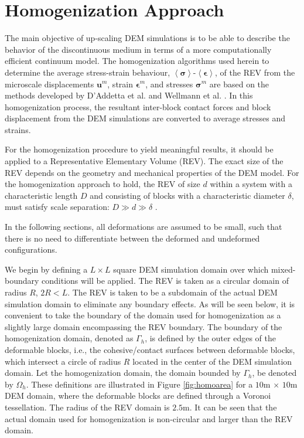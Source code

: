 \section{Homogenization Approach}

The main objective of up-scaling DEM simulations is to be able to describe the  behavior of the discontinuous medium in terms of a more computationally efficient continuum model. The homogenization algorithms used herein to determine the average stress-strain behaviour, $\left<\boldsymbol{\sigma}\right>$-$\left<\boldsymbol{\epsilon}\right>$, of the REV from the microscale displacements $\mathbf{u}^m$, strain $\boldsymbol{\epsilon}^m$, and stresses $\boldsymbol{\sigma}^m$ are based on the methods developed by D'Addetta et al. \citet{daddetta_particle_2004} and Wellmann et al. \citet{wellmann_homogenization_2008}. In this homogenization process, the resultant inter-block contact forces and block displacement from the DEM simulations are converted to average stresses and strains.

For the homogenization procedure to yield meaningful results, it should be applied to a Representative Elementary Volume (REV). The exact size of the REV depends on the geometry and mechanical properties of the DEM model. For the homogenization approach to hold, the REV of size $d$ within a system with a characteristic length $D$ and consisting of blocks with a characteristic diameter $\delta$, must satisfy scale separation: $D\gg d\gg\delta$ \citep{wellmann_homogenization_2008}. 

In the following sections, all deformations are assumed to be small, such that there is no need to differentiate between the deformed and undeformed configurations.  

We begin by defining a $L\times L$ square DEM simulation domain over which mixed-boundary conditions will be applied. The REV is taken as a circular domain of radius $R$, $2R<L$.  The REV is taken to be a subdomain of the actual DEM simulation domain to eliminate any boundary effects.  As will be seen below, it is convenient to take the boundary of the domain used for homogenization as a slightly large domain encompassing the REV boundary. The boundary of the homogenization domain, denoted as $\Gamma_h$, is defined by the outer edges of the deformable blocks, i.e., the cohesive/contact surfaces between deformable blocks, which intersect a circle of radius $R$ located in the center of the DEM simulation domain. Let the homogenization domain, the domain bounded by $\Gamma_h$, be denoted by $\Omega_h$. These definitions are illustrated in Figure \ref{fig:homoarea} for a $10$m $\times$ $10$m DEM domain, where the deformable blocks are defined through a Voronoi tessellation. The radius of the REV domain is $2.5$m.  It can be seen that the actual domain used for homogenization is non-circular and larger than the REV domain. 


